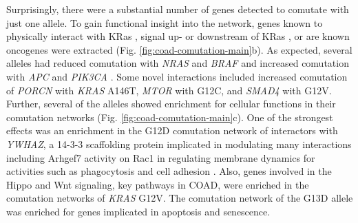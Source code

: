\documentclass[english, 10pt, letterpaper]{article}
\newcommand{\KRAS}{\emph{KRAS}}
\newcommand{\kras}{KRas}
\begin{document}
Surprisingly, there were a substantial number of genes detected to comutate with just one allele.
To gain functional insight into the network, genes known to physically interact with \kras{} \cite{Kovalski2019}, signal up- or downstream of \kras{} \cite{Kanehisa2017, Kanehisa2016KEGGAnnotation.}, or are known oncogenes \cite{Bamford2004TheWebsite., Sondka2018} were extracted (Fig. \ref{fig:coad-comutation-main}b).
As expected, several alleles had reduced comutation with \emph{NRAS} and \emph{BRAF} and increased comutation with \emph{APC} and \emph{PIK3CA} \cite{Sensi2006MutuallyMelanoma., Jauhri2017, Seth2009ConcomitantCancer., Cisowski2016, Janssen2006, Sakai2018, Kennedy2011, Wang2013, Green2015, Yeang2008CombinatorialCancer., CancerGenomeAtlasNetwork2012}. 
Some novel interactions included increased comutation of \emph{PORCN} with \KRAS{} A146T, \emph{MTOR} with G12C, and \emph{SMAD4} with G12V.
Further, several of the alleles showed enrichment for cellular functions in their comutation networks (Fig. \ref{fig:coad-comutation-main}c).
One of the strongest effects was an enrichment in the G12D comutation network of interactors with \emph{YWHAZ}, a 14-3-3 scaffolding protein implicated in modulating many interactions including Arhgef7 activity on Rac1 in regulating membrane dynamics for activities such as phagocytosis and cell adhesion \cite{Angrand2006TransgenicSignaling.}.
Also, genes involved in the Hippo and Wnt signaling, key pathways in COAD, were enriched in the comutation networks of \KRAS{} G12V.
The comutation network of the G13D allele was enriched for genes implicated in apoptosis and senescence.

\end{document}
